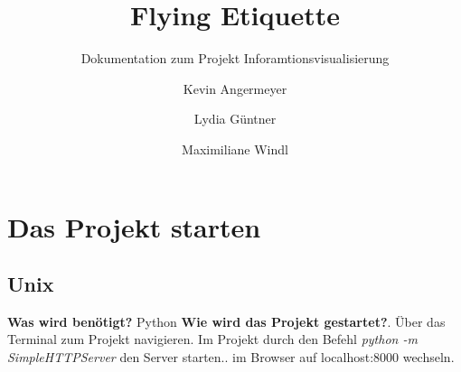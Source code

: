 \documentclass{scrartcl}
\title{Flying Etiquette}
\subtitle{Dokumentation zum Projekt Inforamtionsvisualisierung}
\author{Kevin Angermeyer \\ \and Lydia Güntner \\ \and Maximiliane Windl}
\begin{document}
\maketitle
\section{Das Projekt starten} \label{Das Projekt starten}
\subsection{Unix}
\textbf{Was wird benötigt?}\newline
Python\newline\newline
\textbf{Wie wird das Projekt gestartet?}. Über das Terminal zum Projekt navigieren. Im Projekt durch den Befehl\newline 
\textit{python -m SimpleHTTPServer}\newline
den Server starten.. im Browser auf localhost:8000 wechseln.
\end{document}
